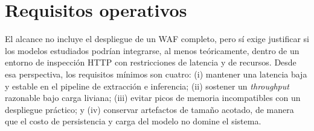 \documentclass[12pt,oneside]{report}
\begin{document}
\section{Requisitos operativos}
El alcance no incluye el despliegue de un WAF completo, pero sí exige justificar si los modelos estudiados podrían integrarse, al menos teóricamente, dentro de un entorno de inspección HTTP con restricciones de latencia y de recursos. Desde esa perspectiva, los requisitos mínimos son cuatro: (i) mantener una latencia baja y estable en el pipeline de extracción e inferencia; (ii) sostener un \textit{throughput} razonable bajo carga liviana; (iii) evitar picos de memoria incompatibles con un despliegue práctico; y (iv) conservar artefactos de tamaño acotado, de manera que el costo de persistencia y carga del modelo no domine el sistema.\
\end{document}
